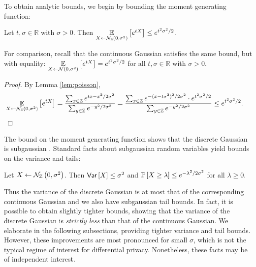 \documentclass{jpc}
\newcommand{\dgausss}[2]{{\discN\left(#1,#2\right)}}
\newcommand{\dgauss}[1]{\dgausss{0}{#1}}
\newcommand{\ex}[2]{{\ifx&#1& \mathbb{E} \else
\underset{#1}{\mathbb{E}} \fi \left[#2\right]}}
\newcommand{\pr}[2]{{\ifx&#1& \mathbb{P} \else
\underset{#1}{\mathbb{P}} \fi \left[#2\right]}}
\newcommand{\var}[2]{{\ifx&#1& \mathsf{Var} \else
\underset{#1}{\mathsf{Var}} \fi \left[#2\right]}}
\newcommand{\Z}{\mathbb{Z}}
\newcommand{\R}{\mathbb{R}}
\begin{document}
To obtain analytic bounds, we begin by bounding the moment generating function:
\begin{lem}
Let $t,\sigma\in\R$ with $\sigma>0$. Then $\ex{X \gets \dgauss{\sigma^2}}{e^{tX}}\le e^{t^2\sigma^2/2}$.
\end{lem}
\noindent For comparison, recall that the continuous Gaussian satisfies the same bound, but with equality: $\ex{X \gets \mathcal{N}(0,\sigma^2)}{e^{tX}}=e^{t^2\sigma^2/2}$ for all $t,\sigma\in\R$ with $\sigma>0$.
\begin{proof}
By Lemma \ref{lem:poisson},
\begin{align*}
    \ex{X \gets \dgauss{\sigma^2}}{e^{tX}} &= \frac{\sum_{x \in \Z} e^{tx-x^2/2\sigma^2}}{\sum_{y \in \Z} e^{-y^2/2\sigma^2}} = \frac{\sum_{x \in \Z} e^{-(x-t\sigma^2)^2/2\sigma^2} \cdot e^{t^2\sigma^2/2}}{\sum_{y \in \Z} e^{-y^2/2\sigma^2}} \le e^{t^2\sigma^2/2}.
\end{align*}
\end{proof}
The bound on the moment generating function shows that the discrete Gaussian is subgaussian \citep{Rivasplata12}. Standard facts about subgaussian random variables yield bounds on the variance and tails:
\begin{cor}
\label{cor:bounds}
Let $X \gets \dgauss{\sigma^2}$. Then $\var{}{X}\le \sigma^2$ and $\pr{}{X\ge\lambda} \le e^{-\lambda^2/2\sigma^2}$ for all $\lambda \ge 0$.
\end{cor}
Thus the variance of the discrete Gaussian is at most that of the corresponding continuous Gaussian and we also have subgaussian tail bounds.
In fact, it is possible to obtain slightly tighter bounds, showing that the variance of the discrete Gaussian is \emph{strictly less} than that of the continuous Gaussian. We elaborate in the following subsections, providing tighter variance and tail bounds. However, these improvements are most pronounced for small $\sigma$, which is not the typical regime of interest for differential privacy. Nonetheless, these facts may be of independent interest. 
\end{document}
